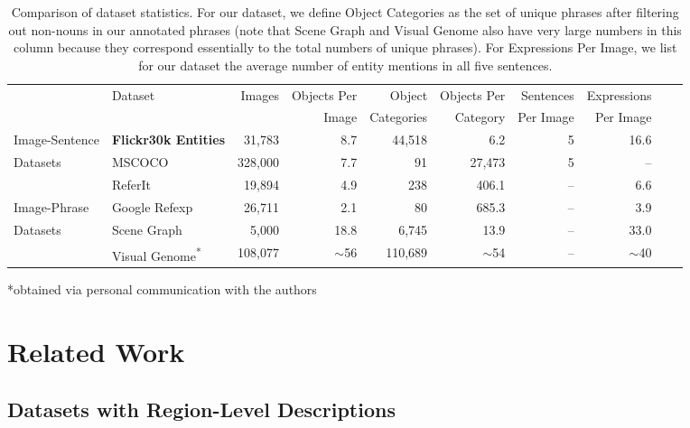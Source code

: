 \documentclass[twocolumn]{svjour3}
\begin{document}
\begin{table*}
\caption{Comparison of dataset statistics. For our dataset, we define Object Categories as the set of unique phrases after filtering out non-nouns in our annotated phrases (note that Scene Graph and Visual Genome also have very large numbers in this column because they correspond essentially to the total numbers of unique phrases). For Expressions Per Image, we list for our dataset the average number of entity mentions in all five sentences. }
\label{table:dataCompare}
\centering
\begin{tabular}{|l|l|r|r|r|r|r|r|r|r|}
\hline
& \multirow{2}{*}{Dataset} & \multirow{2}{*}{Images} &Objects Per & Object & Objects Per & Sentences & Expressions\\
&  & & Image & Categories &Category &  Per Image & Per Image\\
\hline
Image-Sentence & {\bf Flickr30k Entities} & 31,783 & 8.7 & 44,518 & 6.2 & 5 & 16.6 \\
Datasets & MSCOCO~\citep{lin2014microsoft} & 328,000 & 7.7 & 91 & 27,473 & 5 & -- \\
 \hline
 & ReferIt~\citep{kazemzadeh-EtAl:2014:EMNLP2014} & 19,894 & 4.9 & 238 & 406.1 & -- & 6.6\\
Image-Phrase & Google Refexp~\citep{mao2015generation} & 26,711 & 2.1 & 80 & 685.3 & -- & 3.9\\
Datasets & Scene Graph~\citep{Johnson2015CVPR} & 5,000 & 18.8 & 6,745 & 13.9 & -- & 33.0\\
& Visual Genome\textsuperscript{*}~\citep{krishnavisualgenome} & 108,077 & $\sim$56 & 110,689 & $\sim$54 & -- & $\sim$40 \\
\hline
\end{tabular}
\vspace{-3mm}
\flushleft\hspace{1mm}\begingroup
    \fontsize{6pt}{6pt}\selectfont
 *obtained via personal communication with the authors
\endgroup
\vspace{-3mm}
\end{table*}

\section{Related Work}
\label{relatedWork}

\subsection{Datasets with Region-Level Descriptions}
\label{sec:datasets}
\end{document}
